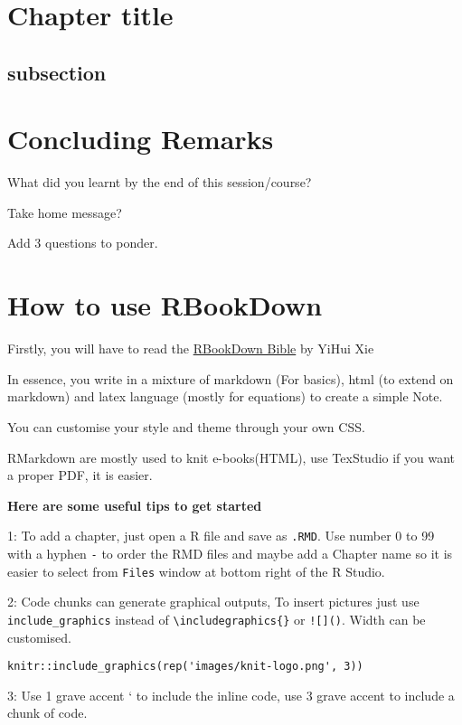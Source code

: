 \documentclass[
]{book}
\begin{document}
\hypertarget{ch4}{%
\chapter{Chapter title}\label{ch4}}

\hypertarget{subsection}{%
\section{subsection}\label{subsection}}

\hypertarget{concluding-remarks}{%
\chapter{Concluding Remarks}\label{concluding-remarks}}

What did you learnt by the end of this session/course?

Take home message?

Add 3 questions to ponder.

\hypertarget{how-to-use-rbookdown}{%
\chapter*{How to use RBookDown}\label{how-to-use-rbookdown}}

Firstly, you will have to read the \href{https://bookdown.org/yihui/bookdown/}{RBookDown Bible} by YiHui Xie

In essence, you write in a mixture of markdown (For basics), html (to extend on markdown) and latex language (mostly for equations) to create a simple Note.

You can customise your style and theme through your own CSS.

RMarkdown are mostly used to knit e-books(HTML), use TexStudio if you want a proper PDF, it is easier.

\textbf{Here are some useful tips to get started}

1: To add a chapter, just open a R file and save as \texttt{.RMD}. Use number 0 to 99 with a hyphen \texttt{-} to order the RMD files and maybe add a Chapter name so it is easier to select from \texttt{Files} window at bottom right of the R Studio.

2: Code chunks can generate graphical outputs, To insert pictures just use \texttt{include\_graphics} instead of \texttt{\textbackslash{}includegraphics\{\}} or \texttt{!{[}{]}()}. Width can be customised.

\begin{verbatim}
knitr::include_graphics(rep('images/knit-logo.png', 3))
\end{verbatim}

3: Use 1 grave accent ` to include the inline code, use 3 grave accent to include a chunk of code.

  
\end{document}
